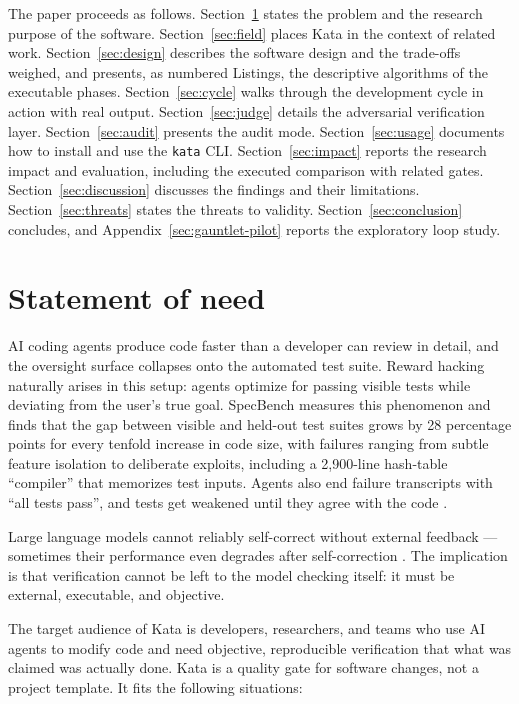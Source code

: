 \documentclass{sbc2019}%
\begin{document}
The paper proceeds as follows. Section~\ref{sec:need}
states the problem and the research purpose of the software.
Section~\ref{sec:field} places Kata in the context of related work.
Section~\ref{sec:design} describes the software design and the trade-offs
weighed, and presents, as numbered Listings, the descriptive algorithms of
the executable phases. Section~\ref{sec:cycle} walks through the development
cycle in action with real output. Section~\ref{sec:judge} details the adversarial
verification layer. Section~\ref{sec:audit} presents the audit mode.
Section~\ref{sec:usage} documents how to install and use the \texttt{kata}
CLI. Section~\ref{sec:impact} reports the research impact and evaluation, including the executed comparison with related gates.
Section~\ref{sec:discussion} discusses the findings and their limitations.
Section~\ref{sec:threats} states the threats to validity.
Section~\ref{sec:conclusion} concludes, and Appendix~\ref{sec:gauntlet-pilot} reports the exploratory loop study.

\section{Statement of need}
\label{sec:need}

AI coding agents produce code faster than a developer can review in detail, and the
oversight surface collapses onto the automated test suite. Reward hacking
naturally arises in this setup: agents optimize for passing visible tests
while deviating from the user's true goal. SpecBench \cite{specbench}
measures this phenomenon and finds that the gap between visible and held-out
test suites grows by 28 percentage points for every tenfold increase in code
size, with failures ranging from subtle feature isolation to deliberate
exploits, including a 2,900-line hash-table ``compiler'' that memorizes test
inputs. Agents also end failure transcripts with ``all tests pass'', and
tests get weakened until they agree with the code \cite{fable}.

Large language models cannot reliably self-correct without external feedback
--- sometimes their performance even degrades after self-correction
\cite{selfcorrect}. The implication is that verification cannot be left to
the model checking itself: it must be external, executable, and objective.

The target audience of Kata is developers, researchers, and teams who use AI
agents to modify code and need objective, reproducible verification that
what was claimed was actually done. Kata is a quality gate for software
changes, not a project template. It fits the following situations:
\end{document}
